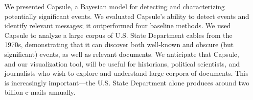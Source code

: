 
We presented Capsule, a Bayesian model for detecting and
characterizing potentially significant events. We evaluated Capsule's
ability to detect events and identify relevant messages; it outperformed four
baseline methods. We used Capsule to analyze a large corpus of U.S. State
Department cables from the 1970s, demonstrating
that it can discover both well-known and obscure (but
significant) events, as well as relevant documents. We anticipate that Capsule, and our
visualization tool, will be useful for historians, political
scientists, and journalists who wish to explore and understand large
corpora of documents. This is increasingly important---the U.S. State Department alone produces
around two billion e-mails annually.
